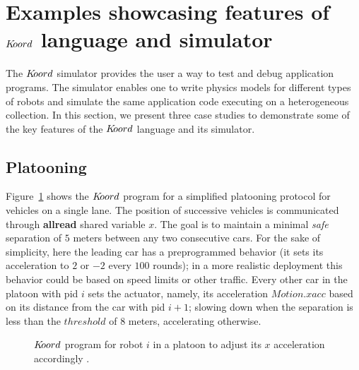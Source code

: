 \section{Examples showcasing features of $K\kern-2pt oord$ language and simulator}
\label{sec:experims}
The $K\kern-2pt oord$ simulator provides the user a way to test and  debug application programs. The simulator enables one to write physics models for different types of robots and simulate the same application code executing on a heterogeneous collection. In this section, we present three case studies to demonstrate some of the key features of the $K\kern-2pt oord$ language and its  simulator.

\subsection{Platooning}
\label{sec:platooning}
Figure~\ref{fig:platooningapp} shows the $K\kern-2pt oord$ program for a simplified platooning protocol for vehicles on a single lane. The position of successive vehicles is communicated through  {\bf allread} shared variable $\mathit{x}$. The  goal is to maintain a minimal  \emph{safe} separation  of $5$ meters between any two consecutive cars. For the sake of simplicity, here the leading car  has a preprogrammed behavior (it sets its acceleration to $2$ or $-2$ every $100$ rounds); in a more realistic deployment this behavior could be based on speed limits or other traffic. 
Every other car in the platoon with pid $i$ sets the actuator, namely, its acceleration $\mathit{Motion.xacc}$ based on its distance from the car with pid $i+1$; slowing down when the separation is less than the $\mathit{threshold}$ of $8$ meters, accelerating otherwise. 

\begin{figure}[ht!]
\begin{mdframed}
    \noindent
    \begin{center}
        \scriptsize
        {}
        {} 
    \end{center}
\end{mdframed}
    \caption{$K\kern-2pt oord$ program for robot $i$ in a platoon to adjust its $x$ acceleration accordingly .}
    \label{fig:platooningapp}
\end{figure}


